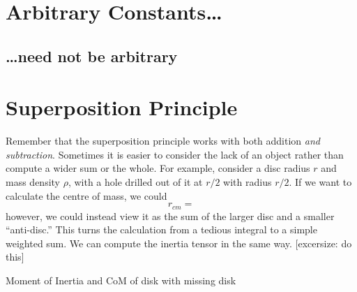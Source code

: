 \section{Arbitrary Constants\ldots}
\subsection{\ldots need not be arbitrary}

\section{Superposition Principle}
Remember that the superposition principle works with both addition \emph{and subtraction}. Sometimes it is easier to consider the lack of an object rather than compute a wider sum or the whole. For example, consider a disc radius \(r\) and mass density \(\rho\), with a hole drilled out of it at \(r/2\) with radius \(r/2\). If we want to calculate the centre of mass, we could 
\[r_{cm} = \]
however, we could instead view it as the sum of the larger disc and a smaller ``anti-disc.'' This turns the calculation from a tedious integral to a simple weighted sum. We can compute the inertia tensor in the same way. [excersize: do this]

Moment of Inertia and CoM of disk with missing disk

